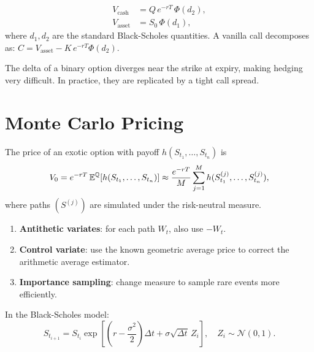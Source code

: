 \begin{proposition}
\begin{align*}
    V_{\mathrm{cash}} &= Q\,e^{-rT}\,\Phi(d_2), \\
    V_{\mathrm{asset}} &= S_0\,\Phi(d_1),
\end{align*}
where $d_1, d_2$ are the standard Black-Scholes quantities. A vanilla call
decomposes as: $C = V_{\mathrm{asset}} - K\,e^{-rT}\Phi(d_2)$.
\end{proposition}

\begin{remark}
The delta of a binary option diverges near the strike at expiry, making
hedging very difficult. In practice, they are replicated by a tight call
spread.
\end{remark}

\section{Monte Carlo Pricing}

\begin{definition}
The price of an exotic option with payoff
$h(S_{t_1}, \ldots, S_{t_n})$ is
\[
    V_0 = e^{-rT}\,\mathbb{E}^{\mathbb{Q}}[h(S_{t_1}, \ldots, S_{t_n})]
    \approx \frac{e^{-rT}}{M}\sum_{j=1}^{M}
    h(S_{t_1}^{(j)}, \ldots, S_{t_n}^{(j)}),
\]
where paths $(S^{(j)})$ are simulated under the risk-neutral measure.
\end{definition}

\begin{proposition}
\begin{enumerate}
    \item \textbf{Antithetic variates}: for each path $W_t$, also use $-W_t$.
    \item \textbf{Control variate}: use the known geometric average price to
    correct the arithmetic average estimator.
    \item \textbf{Importance sampling}: change measure to sample rare events
    more efficiently.
\end{enumerate}
\end{proposition}

\begin{keyformulas}[title=\textbf{Path Simulation under $\Q$}]
In the Black-Scholes model:
\[
    S_{t_{i+1}} = S_{t_i}\exp\!\left[\left(r - \frac{\sigma^2}{2}\right)\Delta t
    + \sigma\sqrt{\Delta t}\,Z_i\right], \quad Z_i \sim \mathcal{N}(0, 1).
\]
\end{keyformulas}

